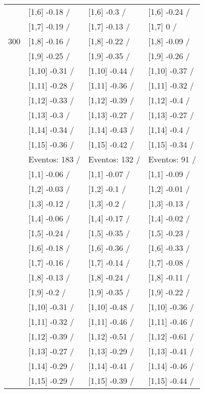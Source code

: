 \begin{table}
\begin{tabular}[t]{llll}
 & {}[1,6] -0.18  / & {}[1,6] -0.3  / & {}[1,6] -0.24  /\\
 & {}[1,7] -0.19  / & {}[1,7] -0.13  / & {}[1,7] 0  /\\
300 & {}[1,8] -0.16  / & {}[1,8] -0.22  / & {}[1,8] -0.09  /\\
\addlinespace
 & {}[1,9] -0.25  / & {}[1,9] -0.35  / & {}[1,9] -0.26  /\\
 & {}[1,10] -0.31  / & {}[1,10] -0.44  / & {}[1,10] -0.37  /\\
 & {}[1,11] -0.28  / & {}[1,11] -0.36  / & {}[1,11] -0.32  /\\
 & {}[1,12] -0.33  / & {}[1,12] -0.39  / & {}[1,12] -0.4  /\\
 & {}[1,13] -0.3  / & {}[1,13] -0.27  / & {}[1,13] -0.27  /\\
\addlinespace
 & {}[1,14] -0.34  / & {}[1,14] -0.43  / & {}[1,14] -0.4  /\\
 & {}[1,15] -0.36  / & {}[1,15] -0.42  / & {}[1,15] -0.34  /\\
 & Eventos:  183 / & Eventos:  132 / & Eventos:  91 /\\
 & {}[1,1] -0.06  / & {}[1,1] -0.07  / & {}[1,1] -0.09  /\\
 & {}[1,2] -0.03  / & {}[1,2] -0.1  / & {}[1,2] -0.01  /\\
\addlinespace
 & {}[1,3] -0.12  / & {}[1,3] -0.2  / & {}[1,3] -0.13  /\\
 & {}[1,4] -0.06  / & {}[1,4] -0.17  / & {}[1,4] -0.02  /\\
 & {}[1,5] -0.24  / & {}[1,5] -0.35  / & {}[1,5] -0.23  /\\
 & {}[1,6] -0.18  / & {}[1,6] -0.36  / & {}[1,6] -0.33  /\\
 & {}[1,7] -0.16  / & {}[1,7] -0.14  / & {}[1,7] -0.08  /\\
\addlinespace
500 & {}[1,8] -0.13  / & {}[1,8] -0.24  / & {}[1,8] -0.11  /\\
 & {}[1,9] -0.2  / & {}[1,9] -0.35  / & {}[1,9] -0.22  /\\
 & {}[1,10] -0.31  / & {}[1,10] -0.48  / & {}[1,10] -0.36  /\\
 & {}[1,11] -0.32  / & {}[1,11] -0.46  / & {}[1,11] -0.46  /\\
 & {}[1,12] -0.39  / & {}[1,12] -0.51  / & {}[1,12] -0.61  /\\
\addlinespace
 & {}[1,13] -0.27  / & {}[1,13] -0.29  / & {}[1,13] -0.41  /\\
 & {}[1,14] -0.29  / & {}[1,14] -0.41  / & {}[1,14] -0.46  /\\
 & {}[1,15] -0.29  / & {}[1,15] -0.39  / & {}[1,15] -0.44  /\\
\bottomrule
\end{tabular}
\end{table}
